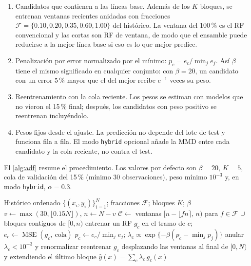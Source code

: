 \documentclass[11pt,a4paper]{article}
\newcommand{\MSE}{\operatorname{MSE}}
\begin{document}
\begin{enumerate}
  \item Candidatos que contienen a las líneas base. Además de los $K$ bloques, se entrenan ventanas
  recientes anidadas con fracciones $\mathcal F=\{0.10,0.20,0.35,0.60,1.00\}$ del histórico. La
  ventana del 100\,\% es el RF convencional y las cortas son RF de ventana, de modo que el ensamble
  puede reducirse a la mejor línea base si eso es lo que mejor predice.
  \item Penalización por error normalizado por el mínimo: $p_c = e_c/\min_j e_j$. Así $\beta$ tiene el
  mismo significado en cualquier conjunto: con $\beta=20$, un candidato con un error 5\,\% mayor que
  el del mejor recibe $e^{-1}$ veces su peso.
  \item Reentrenamiento con la cola reciente. Los pesos se estiman con modelos que no vieron el 15\,\%
  final; después, los candidatos con peso positivo se reentrenan incluyéndolo.
  \item Pesos fijos desde el ajuste. La predicción no depende del lote de test y funciona fila a fila.
  El modo \texttt{hybrid} opcional añade la MMD entre cada candidato y la cola reciente, no contra el
  test.
\end{enumerate}

El \cref{alg:adf} resume el procedimiento. Los valores por defecto son $\beta=20$, $K=5$, cola de
validación del 15\,\% (mínimo 30 observaciones), peso mínimo $10^{-3}$ y, en modo \texttt{hybrid},
$\alpha=0.3$.

\begin{algorithm}[htbp]
\caption{Ajuste del \texttt{AdaptiveDriftForest} (modo \texttt{error})}\label{alg:adf}
\begin{algorithmic}[1]
\Require Histórico ordenado $\{(x_i,y_i)\}_{i=1}^N$; fracciones $\mathcal F$; bloques $K$; $\beta$
\State $v \gets \max(30,\lfloor 0.15N\rfloor)$, \quad $n \gets N-v$ \Comment{cola reciente $[n,N)$}
\State $\mathcal C \gets$ ventanas $[n-\lfloor fn\rceil,\,n)$ para $f\in\mathcal F$ $\cup$ bloques contiguos de $[0,n)$
  \State entrenar un RF $g_c$ en el tramo de $c$; \quad $e_c \gets \MSE(g_c,\ \text{cola})$
\EndFor
\State $p_c \gets e_c/\min_j e_j$; \quad $\lambda_c \propto \exp\{-\beta(p_c-\min_j p_j)\}$
\State anular $\lambda_c<10^{-3}$ y renormalizar
  \State reentrenar $g_c$ desplazando las ventanas al final de $[0,N)$ y extendiendo el último bloque
\EndFor
\Ensure $\hat y(x)=\sum_c \lambda_c\, g_c(x)$
\end{algorithmic}
\end{algorithm}
\end{document}
